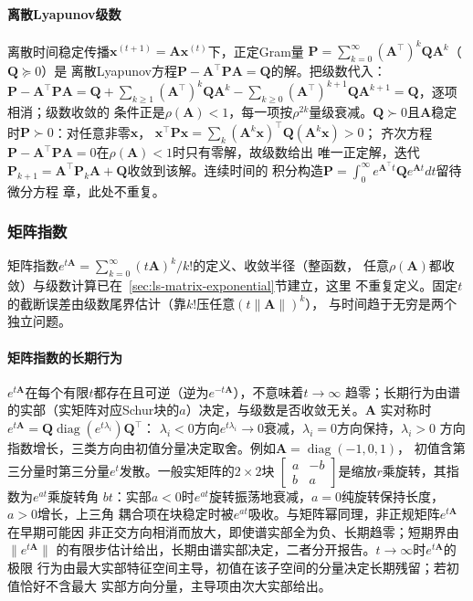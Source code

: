 \paragraph{离散Lyapunov级数}

离散时间稳定传播$\bm x^{(t+1)}=\bm A\bm x^{(t)}$下，正定Gram量
$\bm P=\sum_{k=0}^{\infty}(\bm A^{\top})^k\bm Q\bm A^k$（$\bm Q\succeq0$）是
离散Lyapunov方程$\bm P-\bm A^{\top}\bm P\bm A=\bm Q$的解。把级数代入：
$\bm P-\bm A^{\top}\bm P\bm A=\bm Q+\sum_{k\geq1}(\bm A^{\top})^k\bm Q\bm A^k-
\sum_{k\geq0}(\bm A^{\top})^{k+1}\bm Q\bm A^{k+1}=\bm Q$，逐项相消；级数收敛的
条件正是$\rho(\bm A)<1$，每一项按$\rho^{2k}$量级衰减。$\bm Q\succ0$且$\bm A$稳定
时$\bm P\succ0$：对任意非零$\bm x$，
$\bm x^{\top}\bm P\bm x=\sum_k(\bm A^k\bm x)^{\top}\bm Q(\bm A^k\bm x)>0$；
齐次方程$\bm P-\bm A^{\top}\bm P\bm A=0$在$\rho(\bm A)<1$时只有零解，故级数给出
唯一正定解，迭代$\bm P_{k+1}=\bm A^{\top}\bm P_k\bm A+\bm Q$收敛到该解。连续时间的
积分构造$\bm P=\int_0^\infty e^{\bm A^{\top} t}\bm Qe^{\bm At}dt$留待微分方程
章，此处不重复。

\subsubsection{矩阵指数}

矩阵指数$e^{t\bm A}=\sum_{k=0}^{\infty}(t\bm A)^k/k!$的定义、收敛半径（整函数，
任意$\rho(\bm A)$都收敛）与级数计算已在~\ref{sec:ls-matrix-exponential}节建立，这里
不重复定义。固定$t$的截断误差由级数尾界估计（靠$k!$压任意$(t\lVert\bm A\rVert)^k$），
与时间趋于无穷是两个独立问题。

\paragraph{矩阵指数的长期行为}

$e^{t\bm A}$在每个有限$t$都存在且可逆（逆为$e^{-t\bm A}$），不意味着$t\to\infty$
趋零；长期行为由谱的实部（实矩阵对应Schur块的$a$）决定，与级数是否收敛无关。$\bm A$
实对称时$e^{t\bm A}=\bm Q\operatorname{diag}(e^{t\lambda_i})\bm Q^{\top}$：
$\lambda_i<0$方向$e^{t\lambda_i}\to0$衰减，$\lambda_i=0$方向保持，$\lambda_i>0$
方向指数增长，三类方向由初值分量决定取舍。例如$\bm A=\operatorname{diag}(-1,0,1)$，
初值含第三分量时第三分量$e^t$发散。一般实矩阵的$2\times2$块
$\begin{bmatrix}a&-b\\b&a\end{bmatrix}$是缩放$r$乘旋转，其指数为$e^{at}$乘旋转角
$bt$：实部$a<0$时$e^{at}$旋转振荡地衰减，$a=0$纯旋转保持长度，$a>0$增长，上三角
耦合项在块稳定时被$e^{at}$吸收。与矩阵幂同理，非正规矩阵$e^{t\bm A}$在早期可能因
非正交方向相消而放大，即使谱实部全为负、长期趋零；短期界由$\lVert e^{t\bm A}\rVert$
的有限步估计给出，长期由谱实部决定，二者分开报告。$t\to\infty$时$e^{t\bm A}$的极限
行为由最大实部特征空间主导，初值在该子空间的分量决定长期残留；若初值恰好不含最大
实部方向分量，主导项由次大实部给出。

